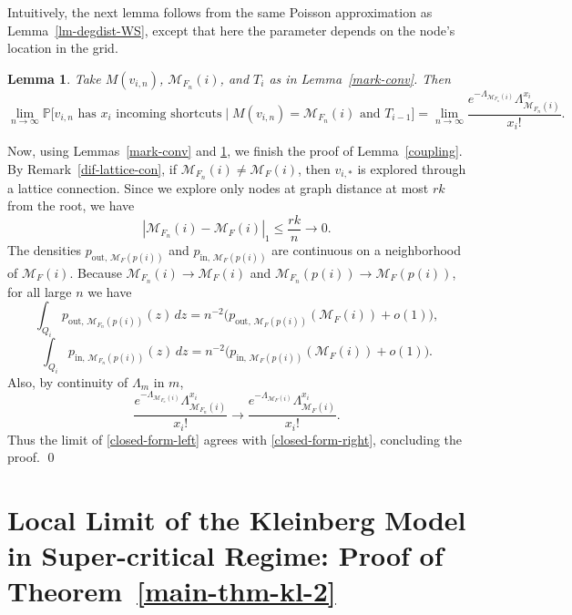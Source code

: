 \documentclass[10pt]{amsart}
\newtheorem{lemma}[theorem]{Lemma}
\begin{document}
Intuitively, the next lemma follows from the same Poisson approximation as Lemma~\ref{lm-degdist-WS}, except that here the parameter depends on the node’s location in the grid.
\begin{lemma}\label{incom-pois-conv}
Take $M(v_{i,n})$, $\mathcal M_{F_n}(i)$, and $T_i$ as in
Lemma~\ref{mark-conv}. Then
\begin{equation}\label{lemma-2}
\lim_{n\to\infty}
\mathbb P\big[\text{$v_{i,n}$ has $x_i$ incoming shortcuts}\mid
M(v_{i,n})=\mathcal M_{F_n}(i)\text{ and }T_{i-1}\big]
=
\lim_{n\to\infty}
\frac{e^{-\Lambda_{\mathcal M_{F_n}(i)}}\Lambda_{\mathcal M_{F_n}(i)}^{x_i}}{x_i!}.
\end{equation}
\end{lemma}

Now, using Lemmas~\ref{mark-conv} and \ref{incom-pois-conv}, we finish the proof
of Lemma~\ref{coupling}. By Remark~\ref{dif-lattice-con}, if
$\mathcal M_{F_n}(i)\neq \mathcal M_F(i)$, then $v_{i,*}$ is explored through a
lattice connection. Since we explore only nodes at graph distance at most $rk$
from the root, we have
\[
|\mathcal M_{F_n}(i)-\mathcal M_F(i)|_1\le \frac{rk}{n}\to 0.
\]
The densities $p_{\mathrm{out},\,\mathcal M_F(p(i))}$ and
$p_{\mathrm{in},\,\mathcal M_F(p(i))}$ are continuous on a neighborhood of
$\mathcal M_F(i)$. Because $\mathcal M_{F_n}(i)\to \mathcal M_F(i)$ and
$\mathcal M_{F_n}(p(i))\to \mathcal M_F(p(i))$, for all large $n$ we have
\[
\int_{Q_i} p_{\mathrm{out},\,\mathcal M_{F_n}(p(i))}(z)\,dz
=
n^{-2}\bigl(p_{\mathrm{out},\,\mathcal M_F(p(i))}(\mathcal M_F(i))+o(1)\bigr),
\]
\[
\int_{Q_i} p_{\mathrm{in},\,\mathcal M_{F_n}(p(i))}(z)\,dz
=
n^{-2}\bigl(p_{\mathrm{in},\,\mathcal M_F(p(i))}(\mathcal M_F(i))+o(1)\bigr).
\]
Also, by continuity of $\Lambda_m$ in $m$,
\[
\frac{e^{-\Lambda_{\mathcal M_{F_n}(i)}}\Lambda_{\mathcal M_{F_n}(i)}^{x_i}}{x_i!}
\to
\frac{e^{-\Lambda_{\mathcal M_F(i)}}\Lambda_{\mathcal M_F(i)}^{x_i}}{x_i!}.
\]
Thus the limit of \eqref{closed-form-left} agrees with
\eqref{closed-form-right}, concluding the proof. \qed

\section{Local Limit of the Kleinberg Model in Super-critical Regime: Proof of Theorem~\ref{main-thm-kl-2}} \label{proof-main-thm-kl-2}
\end{document}
